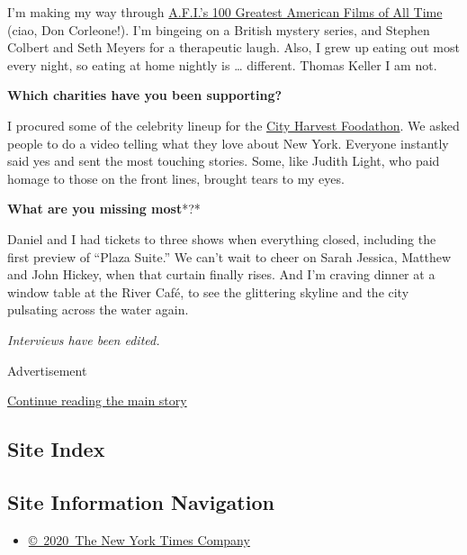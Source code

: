 I'm making my way through
\href{https://www.afi.com/afis-100-years-100-movies/}{A.F.I.'s 100
Greatest American Films of All Time} (ciao, Don Corleone!). I'm bingeing
on a British mystery series, and Stephen Colbert and Seth Meyers for a
therapeutic laugh. Also, I grew up eating out most every night, so
eating at home nightly is \ldots{} different. Thomas Keller I am not.

\textbf{Which charities have you been supporting?}

I procured some of the celebrity lineup for the
\href{https://www.cityharvest.org/foodathon/}{City Harvest Foodathon}.
We asked people to do a video telling what they love about New York.
Everyone instantly said yes and sent the most touching stories. Some,
like Judith Light, who paid homage to those on the front lines, brought
tears to my eyes.

\textbf{What are you missing most}*?*

Daniel and I had tickets to three shows when everything closed,
including the first preview of ``Plaza Suite.'' We can't wait to cheer
on Sarah Jessica, Matthew and John Hickey, when that curtain finally
rises. And I'm craving dinner at a window table at the River Café, to
see the glittering skyline and the city pulsating across the water
again.

\emph{Interviews have been edited.}

Advertisement

\protect\hyperlink{after-bottom}{Continue reading the main story}

\hypertarget{site-index}{%
\subsection{Site Index}\label{site-index}}

\hypertarget{site-information-navigation}{%
\subsection{Site Information
Navigation}\label{site-information-navigation}}

\begin{itemize}
\tightlist
\item
  \href{https://help.nytimes.com/hc/en-us/articles/115014792127-Copyright-notice}{©~2020~The
  New York Times Company}
\end{itemize}

